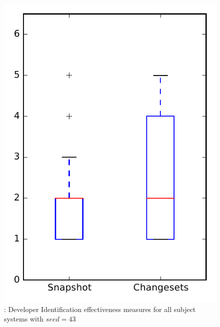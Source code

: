 
\begin{figure}
\centering
\includegraphics[height=0.4\textheight]{figures/dit_seed/rq1_overview_43}
\caption{\rtwo: Developer Identification effectiveness measures for all subject systems with $seed=43$}
\label{fig:dit_seed:rq1:overview}
\end{figure}
